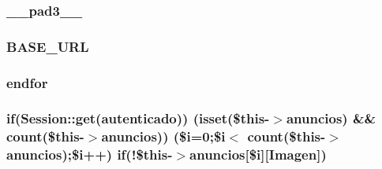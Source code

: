 \subsubsection[{\+\_\+\+\_\+pad3\+\_\+\+\_\+}]{ \+\_\+\+\_\+pad3\+\_\+\+\_\+}\label{app_2views_2anuncios_2index_8php_ad3aa1069376b85bd4e503b216d54b18d}
\hypertarget{app_2views_2anuncios_2index_8php_a16548ab75ed30cbddce178d56d26dbb8}{}
\subsubsection[{B\+A\+S\+E\+\_\+\+U\+R\+L}]{\setlength{\rightskip}{0pt plus 5cm}B\+A\+S\+E\+\_\+\+U\+R\+L}\label{app_2views_2anuncios_2index_8php_a16548ab75ed30cbddce178d56d26dbb8}
\hypertarget{app_2views_2anuncios_2index_8php_ae8fdc27183f296411bac00ed522ee1ac}{}
\subsubsection[{endfor}]{\setlength{\rightskip}{0pt plus 5cm}endfor}\label{app_2views_2anuncios_2index_8php_ae8fdc27183f296411bac00ed522ee1ac}
\hypertarget{app_2views_2anuncios_2index_8php_a3d726968fd3dc3d64cac837a26187799}{}
\subsubsection[{if}]{\setlength{\rightskip}{0pt plus 5cm}if({\bf Session\+::get}(\textquotesingle{}autenticado\textquotesingle{})) (isset(\$this-\/$>$anuncios) \&\& count(\$this-\/$>$anuncios)) (\$i=0;\$i$<$ count(\$this-\/$>$anuncios);\$i++) if(!\$this-\/$>$anuncios\mbox{[}\$i\mbox{]}\mbox{[}\textquotesingle{}Imagen\textquotesingle{}\mbox{]})}\label{app_2views_2anuncios_2index_8php_a3d726968fd3dc3d64cac837a26187799}
